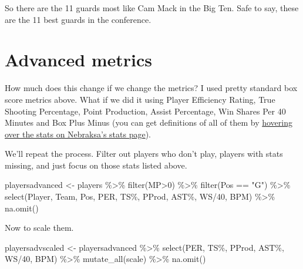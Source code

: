 \documentclass[
]{book}
\newenvironment{Shaded}{\begin{snugshade}}{\end{snugshade}}
\newcommand{\AttributeTok}[1]{\textcolor[rgb]{0.77,0.63,0.00}{#1}}
\newcommand{\DecValTok}[1]{\textcolor[rgb]{0.00,0.00,0.81}{#1}}
\newcommand{\FunctionTok}[1]{\textcolor[rgb]{0.00,0.00,0.00}{#1}}
\newcommand{\NormalTok}[1]{#1}
\newcommand{\OtherTok}[1]{\textcolor[rgb]{0.56,0.35,0.01}{#1}}
\newcommand{\SpecialCharTok}[1]{\textcolor[rgb]{0.00,0.00,0.00}{#1}}
\newcommand{\StringTok}[1]{\textcolor[rgb]{0.31,0.60,0.02}{#1}}
\begin{document}
So there are the 11 guards most like Cam Mack in the Big Ten. Safe to say, these are the 11 best guards in the conference.

\hypertarget{advanced-metrics}{%
\section{Advanced metrics}\label{advanced-metrics}}

How much does this change if we change the metrics? I used pretty standard box score metrics above. What if we did it using Player Efficiency Rating, True Shooting Percentage, Point Production, Assist Percentage, Win Shares Per 40 Minutes and Box Plus Minus (you can get definitions of all of them by \href{https://www.sports-reference.com/cbb/schools/nebraska/2020.html}{hovering over the stats on Nebraksa's stats page}).

We'll repeat the process. Filter out players who don't play, players with stats missing, and just focus on those stats listed above.

\begin{Shaded}
\begin{Highlighting}[]
\NormalTok{playersadvanced }\OtherTok{\textless{}{-}}\NormalTok{ players }\SpecialCharTok{\%\textgreater{}\%} 
  \FunctionTok{filter}\NormalTok{(MP}\SpecialCharTok{\textgreater{}}\DecValTok{0}\NormalTok{) }\SpecialCharTok{\%\textgreater{}\%} 
  \FunctionTok{filter}\NormalTok{(Pos }\SpecialCharTok{==} \StringTok{"G"}\NormalTok{) }\SpecialCharTok{\%\textgreater{}\%} 
  \FunctionTok{select}\NormalTok{(Player, Team, Pos, PER, }\StringTok{\textasciigrave{}}\AttributeTok{TS\%}\StringTok{\textasciigrave{}}\NormalTok{, PProd, }\StringTok{\textasciigrave{}}\AttributeTok{AST\%}\StringTok{\textasciigrave{}}\NormalTok{, }\StringTok{\textasciigrave{}}\AttributeTok{WS/40}\StringTok{\textasciigrave{}}\NormalTok{, BPM) }\SpecialCharTok{\%\textgreater{}\%} 
  \FunctionTok{na.omit}\NormalTok{() }
\end{Highlighting}
\end{Shaded}

Now to scale them.

\begin{Shaded}
\begin{Highlighting}[]
\NormalTok{playersadvscaled }\OtherTok{\textless{}{-}}\NormalTok{ playersadvanced }\SpecialCharTok{\%\textgreater{}\%} 
  \FunctionTok{select}\NormalTok{(PER, }\StringTok{\textasciigrave{}}\AttributeTok{TS\%}\StringTok{\textasciigrave{}}\NormalTok{, PProd, }\StringTok{\textasciigrave{}}\AttributeTok{AST\%}\StringTok{\textasciigrave{}}\NormalTok{, }\StringTok{\textasciigrave{}}\AttributeTok{WS/40}\StringTok{\textasciigrave{}}\NormalTok{, BPM) }\SpecialCharTok{\%\textgreater{}\%} 
  \FunctionTok{mutate\_all}\NormalTok{(scale) }\SpecialCharTok{\%\textgreater{}\%} 
  \FunctionTok{na.omit}\NormalTok{()}
\end{Highlighting}
\end{Shaded}
\end{document}
